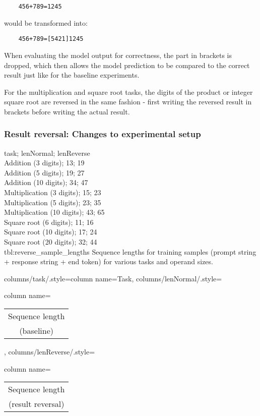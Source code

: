 \begin{lstlisting}
    456+789=1245
\end{lstlisting}

\noindent
would be transformed into:

\begin{lstlisting}
    456+789=[5421]1245
\end{lstlisting}

\noindent
When evaluating the model output for correctness, the part in brackets is dropped, which then allows the model prediction to be compared to the correct result just like for the baseline experiments.

For the multiplication and square root tasks, the digits of the product or integer square root are reversed in the same fashion - first writing the reversed result in brackets before writing the actual result.

\subsubsection{Result reversal: Changes to experimental setup}

{
    task; lenNormal; lenReverse\\
    Addition (3 digits); 13; 19 \\
    Addition (5 digits); 19; 27 \\
    Addition (10 digits); 34; 47 \\
    Multiplication (3 digits); 15; 23 \\
    Multiplication (5 digits); 23; 35 \\
    Multiplication (10 digits); 43; 65 \\
    Square root (6 digits); 11; 16 \\
    Square root (10 digits); 17; 24 \\
    Square root (20 digits); 32; 44 \\
}
{tbl:reverse_sample_lengths}
{
    Sequence lengths for training samples (prompt string + response string + end token) for various tasks and operand sizes.
}
{%
    columns/task/.style={column name={Task}},
    columns/lenNormal/.style={column name={\begin{tabular}{c} Sequence length \\ (baseline) \\ \end{tabular}}},
    columns/lenReverse/.style={column name={\begin{tabular}{c} Sequence length \\ (result reversal) \\ \end{tabular}}}
}

